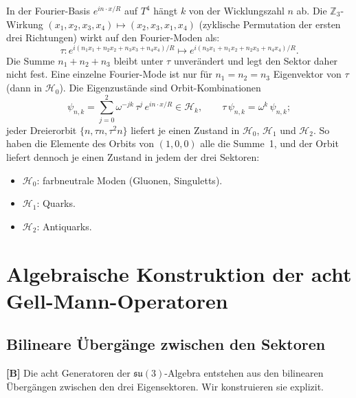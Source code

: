In der Fourier-Basis $e^{in\cdot x/R}$ auf $T^4$ hängt $k$ von
der Wicklungszahl $n$ ab. Die $\mathbb{Z}_3$-Wirkung
$(x_1,x_2,x_3,x_4) \mapsto (x_2,x_3,x_1,x_4)$ (zyklische Permutation
der ersten drei Richtungen) wirkt auf den Fourier-Moden als:
\begin{equation}
  \tau: e^{i(n_1 x_1+n_2 x_2+n_3 x_3+n_4 x_4)/R}
  \mapsto e^{i(n_3 x_1+n_1 x_2+n_2 x_3+n_4 x_4)/R}.
  \label{eq:tau_fourier}
\end{equation}
Die Summe $n_1+n_2+n_3$ bleibt unter $\tau$ unverändert und legt den
Sektor daher nicht fest. Eine einzelne Fourier-Mode ist nur für
$n_1=n_2=n_3$ Eigenvektor von $\tau$ (dann in $\mathcal{H}_0$). Die
Eigenzustände sind Orbit-Kombinationen
\begin{equation}
  \psi_{n,k} = \sum_{j=0}^{2}\omega^{-jk}\,\tau^j\,e^{in\cdot x/R}
  \in \mathcal{H}_k, \qquad \tau\,\psi_{n,k} = \omega^k\,\psi_{n,k};
\end{equation}
jeder Dreierorbit $\{n,\tau n,\tau^2 n\}$ liefert je einen Zustand in
$\mathcal{H}_0$, $\mathcal{H}_1$ und $\mathcal{H}_2$. So haben die
Elemente des Orbits von $(1,0,0)$ alle die Summe~1, und der Orbit
liefert dennoch je einen Zustand in jedem der drei Sektoren:
\begin{itemize}
  \item $\mathcal{H}_0$: farbneutrale Moden (Gluonen, Singuletts).
  \item $\mathcal{H}_1$: Quarks.
  \item $\mathcal{H}_2$: Antiquarks.
\end{itemize}

\section{Algebraische Konstruktion der acht Gell-Mann-Operatoren}

\subsection{Bilineare Übergänge zwischen den Sektoren}

\textbf{[B]} Die acht Generatoren der $\mathfrak{su}(3)$-Algebra
entstehen aus den bilinearen Übergängen zwischen den drei
Eigensektoren. Wir konstruieren sie explizit.

